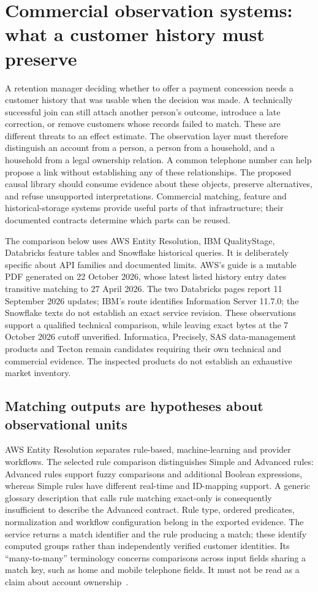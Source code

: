 \section{Commercial observation systems: what a customer history must preserve}
\label{exec22:obs-scope}

A retention manager deciding whether to offer a payment concession needs a customer
history that was usable when the decision was made. A technically successful join
can still attach another person's outcome, introduce a late correction, or remove
customers whose records failed to match. These are different threats to an effect
estimate. The observation layer must therefore distinguish an account from a
person, a person from a household, and a household from a legal ownership relation.
A common telephone number can help propose a link without establishing any of
these relationships. The proposed causal library should consume evidence about
these objects, preserve alternatives, and refuse unsupported interpretations.
Commercial matching, feature and historical-storage systems provide useful parts
of that infrastructure; their documented contracts determine which parts can be
reused.

The comparison below uses AWS Entity Resolution, IBM QualityStage, Databricks
feature tables and Snowflake historical queries. It is deliberately specific about
API families and documented limits. AWS's guide is a mutable PDF generated on
22 October 2026, whose latest listed history entry dates transitive matching to
27 April 2026. The two Databricks pages report 11 September 2026 updates; IBM's
route identifies Information Server 11.7.0; the Snowflake texts do not establish an
exact service revision. These observations support a qualified technical
comparison, while leaving exact bytes at the 7 October 2026 cutoff unverified.
Informatica, Precisely, SAS data-management products and Tecton remain candidates
requiring their own technical and commercial evidence. The inspected products do
not establish an exhaustive market inventory.

\subsection{Matching outputs are hypotheses about observational units}
\label{exec22:obs-linkage}

AWS Entity Resolution separates rule-based, machine-learning and provider
workflows. The selected rule comparison distinguishes Simple and Advanced rules:
Advanced rules support fuzzy comparisons and additional Boolean expressions,
whereas Simple rules have different real-time and ID-mapping support. A generic
glossary description that calls rule matching exact-only is consequently
insufficient to describe the Advanced contract. Rule type, ordered predicates,
normalization and workflow configuration belong in the exported evidence.
The service returns a match identifier and the rule producing a match; these
identify computed groups rather than independently verified customer identities.
Its ``many-to-many'' terminology concerns comparisons across input fields sharing
a match key, such as home and mobile telephone fields. It must not be read as a
claim about account ownership~\citep{exec22_obs_aws_er_manual}.

